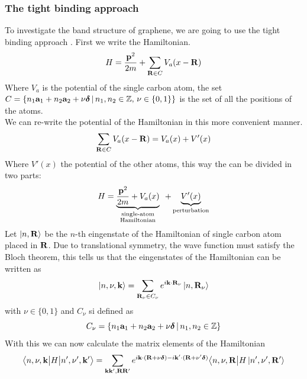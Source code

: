 \subsubsection*{The tight binding approach}
To investigate the band structure of graphene, we are going to use the tight binding approach \cite{bloch1929quantenmechanik,slater1954simplified}.
First we write the Hamiltonian.
\begin{equation}
    H=\frac{\mathbf{p}^2}{2m} + \sum_{\mathbf{R}\in C}V_a(x-\mathbf{R})
    \label{eq:blochhamiltonian}
\end{equation}
Where $V_a$ is the potential of the single carbon atom, the set\\ $C=\left\{n_1\mathbf{a}_1 +n_2\mathbf{a}_2 + \nu\boldsymbol \delta\,|\,n_1,n_2\in \mathbb Z,\, \nu\in \{0,1\} \right\}$ is the set of all the positions of the atoms.\\ We can re-write the potential of the Hamiltonian in this more convenient manner.
\begin{equation}
    \sum_{\mathbf{R}\in C}V_a(x-\mathbf{R}) = V_a(x)+ V'(x)
\end{equation}
Where $V'(x)$ the potential of the other atoms, this way the can be divided in two parts:
\begin{equation}
    H=\underbrace{\frac{\mathbf{p}^2}{2m} + V_a(x)}_{\substack{\text{single-atom}\\\text{Hamiltonian}}} \,\,\,+ \underbrace{V'(x)}_\text{perturbation}
    \label{eq:blochhamiltoniandivided}
\end{equation}
Let $\ket{n,\mathbf{R}}$ be the $n$-th eingenstate of the Hamiltonian of single carbon atom placed in $\mathbf{R}$.
Due to translational symmetry, the wave function must satisfy the Bloch theorem, this tells us that the eingenstates of the Hamiltonian can be written as
\begin{equation}
    \ket{n,\nu,\mathbf{k}}=\sum_{\mathbf{R}_\nu\in C_\nu} e^{i\mathbf{k} \cdot \mathbf{R}_\nu}\ket{n,\mathbf{R}_\nu}
\end{equation}
with $\nu\in\{0,1\}$ and $C_\nu$ si defined as
\[
    C_\nu=\left\{n_1\mathbf{a}_1 +n_2\mathbf{a}_2 + \nu\boldsymbol \delta\,|\,n_1,n_2\in \mathbb Z\right\}
\]
With this we can now calculate the matrix elements of the Hamiltonian
\begin{equation}
    \big\langle n,\nu,\mathbf{k}\big|H\big| n',\nu',\mathbf{k}'\big\rangle=
    \sum_{\mathbf{k}\mathbf{k}',\mathbf{R}\mathbf{R}'}
    e^{i\mathbf{k}\cdot (\mathbf{R} +\nu\boldsymbol \delta)-i\mathbf{k}'\cdot(\mathbf{R} +\nu' \boldsymbol \delta)}
    \big\langle n,\nu,\mathbf{R}\big|H\ket{n',\nu',\mathbf{R}'}
\end{equation}

